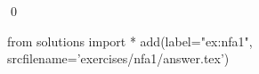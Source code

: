 
\begin{ex} 
  \label{ex:nfa1}
  
  \qed
\end{ex} 
\begin{python0}
from solutions import *
add(label="ex:nfa1",
    srcfilename='exercises/nfa1/answer.tex') 
\end{python0}
